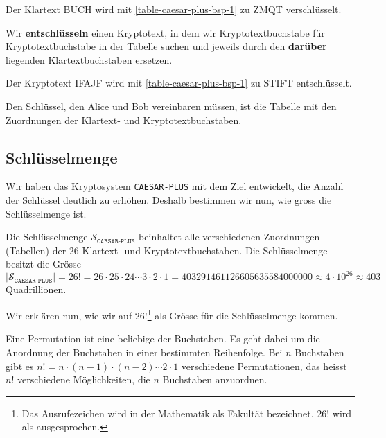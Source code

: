 \begin{example}
Der Klartext BUCH wird mit \autoref{table-caesar-plus-bsp-1} zu ZMQT verschlüsselt.
\end{example}

Wir \textbf{entschlüsseln} einen Kryptotext, in dem wir Kryptotextbuchstabe für Kryptotextbuchstabe in der Tabelle suchen und jeweils durch den \textbf{darüber} liegenden Klartextbuchstaben ersetzen.

\begin{example}
Der Kryptotext IFAJF wird mit \autoref{table-caesar-plus-bsp-1} zu STIFT entschlüsselt.
\end{example}

\begin{definition}
Den Schlüssel, den Alice und Bob vereinbaren müssen, ist die Tabelle mit den Zuordnungen der Klartext- und Kryptotextbuchstaben.
\end{definition}

\vspace{-0.7cm}

\subsection{Schlüsselmenge}

Wir haben das Kryptosystem \texttt{CAESAR-PLUS} mit dem Ziel entwickelt, die Anzahl der Schlüssel deutlich zu erhöhen. Deshalb bestimmen wir nun, wie gross die Schlüsselmenge ist.

\begin{definition}
Die Schlüsselmenge $\mathscr{S}_{\texttt{CAESAR-PLUS}}$ beinhaltet alle verschiedenen Zuordnungen (Tabellen) der \num{26} Klartext- und Kryptotextbuchstaben. Die Schlüsselmenge besitzt die Grösse $|\mathscr{S}_{\texttt{CAESAR-PLUS}}|=26! = 26 \cdot 25 \cdot 24 \cdots 3 \cdot 2 \cdot 1 = \num{403291461126605635584000000} \approx 4 \cdot 10^{26} \approx 403$ Quadrillionen.
\end{definition}

\vspace{-0.2cm}

Wir erklären nun, wie wir auf $26!$\footnote{Das Ausrufezeichen wird in der Mathematik als Fakultät bezeichnet. $26!$ wird als  ausgesprochen.} als Grösse für die Schlüsselmenge kommen.

\begin{definition}
	Eine Permutation ist eine beliebige  der Buchstaben. Es geht dabei um die Anordnung der Buchstaben in einer bestimmten Reihenfolge. Bei $n$ Buchstaben gibt es $n! = n \cdot (n-1) \cdot (n-2) \cdots 2 \cdot 1$ verschiedene Permutationen, das heisst $n!$ verschiedene Möglichkeiten, die $n$ Buchstaben anzuordnen.
\end{definition}

